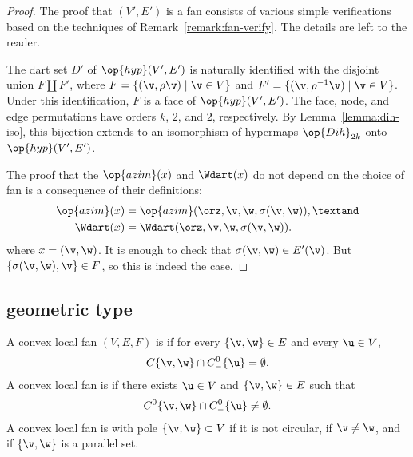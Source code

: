 \begin{proof}
The proof that $(V',E')$ is a fan consists of various simple
verifications based on the techniques of
Remark~\ref{remark:fan-verify}.  The details are left to the reader.

The dart set $D'$ of $\op{hyp}(V',E')$ is naturally identified with
the disjoint union $F\coprod F'$, where $F = \{(\v,\rho\v) \mid \v\in
V\}$ and $F'=\{(\v,\rho^{-1}\v) \mid \v\in V\}$.  Under this
identification, $F$ is a face of $\op{hyp}(V',E')$.  The face, node,
and edge permutations have orders $k$, $2$, and $2$, respectively.  By
Lemma~\ref{lemma:dih-iso}, this bijection extends to an isomorphism of
hypermaps $\op{Dih}_{2k}$ onto $\op{hyp}(V',E')$.

The proof that the $\op{azim}(x)$ and $\Wdart(x)$ do not depend on the
choice of fan is a consequence of their definitions:
\begin{align*}
\op{azim}(x) &= \op{azim}(\orz,\v,\w,\sigma(\v,\w)),\textand \\
\Wdart(x) &= \Wdart(\orz,\v,\w,\sigma(\v,\w)).\\
\end{align*}
where $x = (\v,\w)$.  It is enough to check that $\sigma(\v,\w)\in
E'(\v)$.  But $\{\sigma(\v,\w),\v\}\in F$, so this is indeed the case.
\end{proof}



\subsection{geometric type}\label{sec:types}

\begin{definition}
A convex local fan $(V,E,F)$ is   if for every $\{\v,\w\}\in E$
and every $\u\in V$, 
\[ 
C\{\v,\w\}\cap C^0_-\{\u\} = \emptyset.
\] 
A convex local fan is   if there exists $\u\in V$ and
$\{\v,\w\}\in E$ such that
\[ 
C^0\{\v,\w\}\cap C^0_-\{\u\}\ne \emptyset.
\] 
A convex local fan is  with pole $\{\v,\w\} \subset V$ if it is not
circular, if $\v\ne\w$, and if $\{\v,\w\}$ is a parallel set.
\end{definition}
%
%
%



